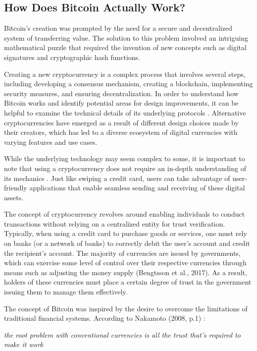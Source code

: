 \subsection{How Does Bitcoin Actually Work?}
Bitcoin's creation was prompted by the need for a secure and decentralized system of transferring value. The solution to this problem involved an intriguing mathematical puzzle that required the invention of new concepts such as digital signatures and cryptographic hash functions.

Creating a new cryptocurrency is a complex process that involves several steps, including developing a consensus mechanism, creating a blockchain, implementing security measures, and ensuring decentralization. In order to understand how Bitcoin works and identify potential areas for design improvements, it can be helpful to examine the technical details of its underlying protocols \cite{nakamoto2008bitcoin}. Alternative cryptocurrencies have emerged as a result of different design choices made by their creators, which has led to a diverse ecosystem of digital currencies with varying features and use cases.

While the underlying technology may seem complex to some, it is important to note that using a cryptocurrency does not require an in-depth understanding of its mechanics \cite{barski2014bitcoin}. Just like swiping a credit card, users can take advantage of user-friendly applications that enable seamless sending and receiving of these digital assets.

The concept of cryptocurrency revolves around enabling individuals to conduct transactions without relying on a centralized entity for trust verification. Typically, when using a credit card to purchase goods or services, one must rely on banks (or a network of banks) to correctly debit the user's account and credit the recipient's account. The majority of currencies are issued by governments, which can exercise some level of control over their respective currencies through means such as adjusting the money supply (Bengtsson et al., 2017). As a result, holders of these currencies must place a certain degree of trust in the government issuing them to manage them effectively.

The concept of Bitcoin was inspired by the desire to overcome the limitations of traditional financial systems. According to Nakamoto (2008, p.1) \cite{nakamoto2008bitcoin}:

\begin{displayquote}
    \textit{the root problem with conventional currencies is all the trust that's required to make it work}
\end{displayquote}

